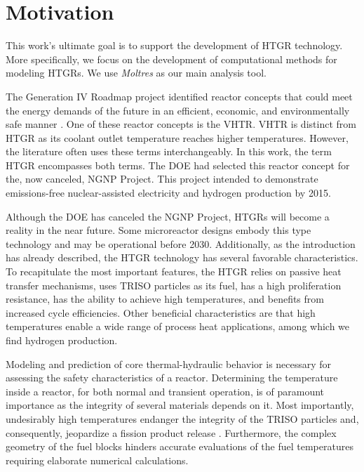 \documentclass[11pt,letterpaper]{article}
\begin{document}
\section{Motivation}

This work's ultimate goal is to support the development of \gls{HTGR} technology.
More specifically, we focus on the development of computational methods for modeling \glspl{HTGR}.
We use \textit{Moltres} as our main analysis tool.

The Generation IV Roadmap project identified reactor concepts that could meet the energy demands of the future in an efficient, economic, and environmentally safe manner \cite{macdonald_ngnp_2003}.
One of these reactor concepts is the \gls{VHTR}.
\gls{VHTR} is distinct from \gls{HTGR} as its coolant outlet temperature reaches higher temperatures.
However, the literature often uses these terms interchangeably.
In this work, the term \gls{HTGR} encompasses both terms.
The \gls{DOE} had selected this reactor concept for the, now canceled, \gls{NGNP} Project.
This project intended to demonstrate emissions-free nuclear-assisted electricity and hydrogen production by 2015.

Although the \gls{DOE} has canceled the \gls{NGNP} Project, \glspl{HTGR} will become a reality in the near future.
Some microreactor designs embody this type technology and may be operational before 2030.
Additionally, as the introduction has already described, the \gls{HTGR} technology has several favorable characteristics.
To recapitulate the most important features, the \gls{HTGR} relies on passive heat transfer mechanisms, uses TRISO particles as its fuel, has a high proliferation resistance, has the ability to achieve high temperatures, and benefits from increased cycle efficiencies.
Other beneficial characteristics are that high temperatures enable a wide range of process heat applications, among which we find hydrogen production.

Modeling and prediction of core thermal-hydraulic behavior is necessary for assessing the safety characteristics of a reactor.
Determining the temperature inside a reactor, for both normal and transient operation, is of paramount importance as the integrity of several materials depends on it.
Most importantly, undesirably high temperatures endanger the integrity of the TRISO particles and, consequently, jeopardize a fission product release \cite{tak_numerical_2008}.
Furthermore, the complex geometry of the fuel blocks hinders accurate evaluations of the fuel temperatures requiring elaborate numerical calculations.
\end{document}
